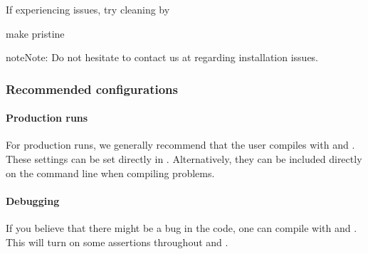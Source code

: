\documentclass[letterpaper,10pt,english]{sphinxmanual}
\begin{document}
If experiencing issues, try cleaning  by

\begin{sphinxVerbatim}[commandchars=\\\{\},formatcom=\scriptsize]
 
make pristine
\end{sphinxVerbatim}

\begin{sphinxadmonition}{note}{Note:}
Do not hesitate to contact us at  regarding installation issues.
\end{sphinxadmonition}


\subsubsection{Recommended configurations}
\label{\detokenize{Base/Installation:recommended-configurations}}

\paragraph{Production runs}
\label{\detokenize{Base/Installation:production-runs}}
For production runs, we generally recommend that the user compiles with  and .
These settings can be set directly in .
Alternatively, they can be included directly on the command line when compiling problems.


\paragraph{Debugging}
\label{\detokenize{Base/Installation:debugging}}
If you believe that there might be a bug in the code, one can compile with  and .
This will turn on some assertions throughout  and .
\end{document}
